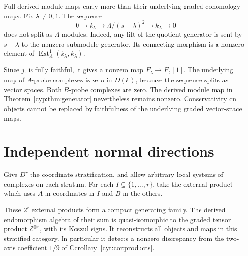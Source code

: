 \begin{example}\label{cyp:ex:extension}
Full derived module maps carry more than their underlying
graded cohomology maps. Fix \(\lambda\ne0,1\). The sequence
\[
 0\longrightarrow k_\lambda\longrightarrow
 \Lambda/(s-\lambda)^2\longrightarrow k_\lambda
 \longrightarrow0
\]
does not split as \(\Lambda\)-modules. Indeed, any lift of
the quotient generator is sent by \(s-\lambda\) to the
nonzero submodule generator. Its connecting morphism is a
nonzero element of
\(\operatorname{Ext}^1_\Lambda(k_\lambda,k_\lambda)\).

Since \(j_!\) is fully faithful, it gives a nonzero map
\(F_\lambda\to F_\lambda[1]\).
The underlying map of \(A\)-probe complexes is zero in
\(D(k)\), because the sequence splits as vector spaces.
Both \(B\)-probe complexes are zero. The derived module
map in Theorem~\ref{cyp:thm:generator} nevertheless remains
nonzero. Conservativity on objects cannot be replaced by
faithfulness of the underlying graded vector-space maps.
\end{example}

\section{Independent normal directions}

Give \(D^r\) the coordinate stratification, and allow arbitrary
local systems of complexes on each stratum. For each
\(I\subseteq\{1,\ldots,r\}\), take the external product
which uses \(A\) in coordinates in \(I\) and \(B\) in
the others.

\begin{proposition}\label{cyp:prop:normal-crossings}
These \(2^r\) external products form a compact generating
family. The derived endomorphism algebra of their sum is
quasi-isomorphic to the graded tensor product
\(\mathcal E^{\otimes r}\), with its Koszul signs.
It reconstructs all objects and maps in this stratified
category. In particular it detects a nonzero discrepancy
from the two-axis coefficient \(1/9\) of
Corollary~\ref{cyt:cor:products}.
\end{proposition}

